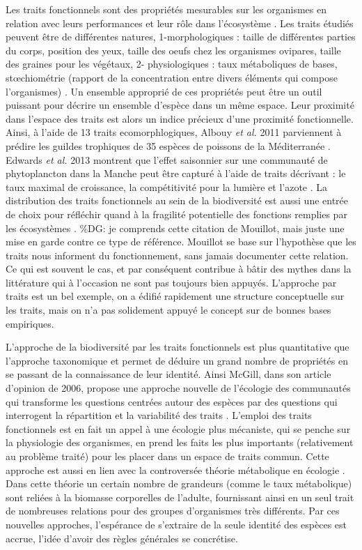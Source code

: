 Les traits fonctionnels sont des propriétés mesurables sur les
organismes en relation avec leurs performances et leur rôle dans
l'écosystème \cite{McGill2006}. Les traits étudiés peuvent être de
différentes natures, 1-morphologiques : taille de différentes parties du
corps, position des yeux, taille des oeufs chez les organismes ovipares,
taille des graines pour les végétaux, 2- physiologiques : taux
métaboliques de bases, stœchiométrie (rapport de la concentration entre
divers éléments qui compose l'organismes)
\cite{McGill2006,Albouy2011,Litchman2008}. Un ensemble approprié de ces
propriétés peut être un outil puissant pour décrire un ensemble d'espèce
dans un même espace. Leur proximité dans l'espace des traits est alors
un indice précieux d'une proximité fonctionnelle. Ainsi, à l'aide de 13
traits ecomorphlogiques, Albouy \textit{et al.} 2011 parviennent à
prédire les guildes trophiques de 35 espèces de poissons de la
Méditerranée \cite{Albouy2011}. Edwards \textit{et al.} 2013 montrent
que l'effet saisonnier sur une communauté de phytoplancton dans la
Manche peut être capturé à l'aide de traits décrivant : le taux maximal
de croissance, la compétitivité pour la lumière et l'azote
\cite{Edwards2013}. La distribution des traits fonctionnels au sein de
la biodiversité est aussi une entrée de choix pour réfléchir quand à la
fragilité potentielle des fonctions remplies par les écosystèmes
\cite{Mouillot2013}. \%DG: je comprends cette citation de Mouillot, mais
juste une mise en garde contre ce type de référence. Mouillot se base
sur l'hypothèse que les traits nous informent du fonctionnement, sans
jamais documenter cette relation. Ce qui est souvent le cas, et par
conséquent contribue à bâtir des mythes dans la littérature qui à
l'occasion ne sont pas toujours bien appuyés. L'approche par traits est
un bel exemple, on a édifié rapidement une structure conceptuelle sur
les traits, mais on n'a pas solidement appuyé le concept sur de bonnes
bases empiriques.

L'approche de la biodiversité par les traits fonctionnels est plus
quantitative que l'approche taxonomique et permet de déduire un grand
nombre de propriétés en se passant de la connaissance de leur identité.
Ainsi McGill, dans son article d'opinion de 2006, propose une approche
nouvelle de l'écologie des communautés qui transforme les questions
centrées autour des espèces par des questions qui interrogent la
répartition et la variabilité des traits \cite{McGill2006}. L'emploi des
traits fonctionnels est en fait un appel à une écologie plus mécaniste,
qui se penche sur la physiologie des organismes, en prend les faits les
plus importants (relativement au problème traité) pour les placer dans
un espace de traits commun. Cette approche est aussi en lien avec la
controversée théorie métabolique en écologie
\cite{Brown2004, Price2012}. Dans cette théorie un certain nombre de
grandeurs (comme le taux métabolique) sont reliées à la biomasse
corporelles de l'adulte, fournissant ainsi en un seul trait de
nombreuses relations pour des groupes d'organismes très différents. Par
ces nouvelles approches, l'espérance de s'extraire de la seule identité
des espèces est accrue, l'idée d'avoir des règles générales se
concrétise.

